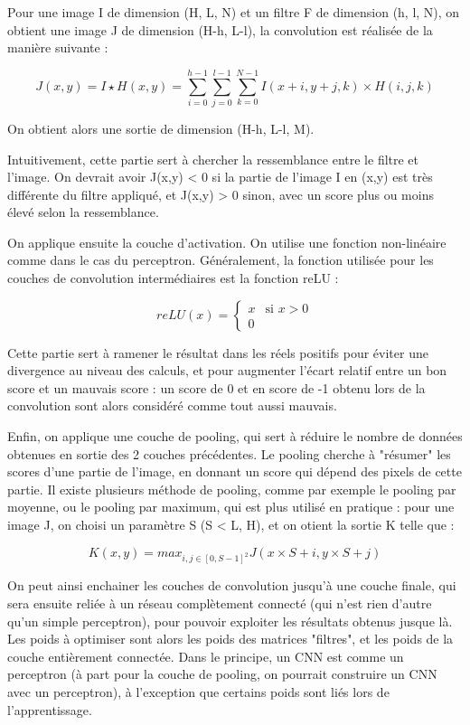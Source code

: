 Pour une image I de dimension (H, L, N) et un filtre F de dimension (h, l, N), on obtient une image J de dimension (H-h, L-l), la convolution est réalisée de la manière suivante :

\begin{equation}
    J(x, y) = I \star H (x, y) = \sum_{i=0}^{h - 1} \sum_{j=0}^{l- 1} \sum_{k=0}^{N - 1} I(x+i, y+j, k) \times H(i, j, k)
\end{equation}

On obtient alors une sortie de dimension (H-h, L-l, M).

Intuitivement, cette partie sert à chercher la ressemblance entre le filtre et l'image.
On devrait avoir J(x,y) < 0 si la partie de l'image I en (x,y) est très différente du filtre appliqué, et J(x,y) > 0 sinon, avec un score plus ou moins élevé selon la ressemblance.


On applique ensuite la couche d'activation. On utilise une fonction non-linéaire comme dans le cas du perceptron. 
Généralement, la fonction utilisée pour les couches de convolution intermédiaires est la fonction reLU :

$$
reLU(x) = \left\{
    \begin{array}{ll}
        x & \mbox{si } x > 0 \\
        0
    \end{array}
\right.
$$

\newpage 

Cette partie sert à ramener le résultat dans les réels positifs pour éviter une divergence au niveau des calculs, et pour augmenter l'écart relatif entre un bon score et un mauvais score : un score de 0 et en score de -1 obtenu lors de la convolution sont alors considéré comme tout aussi mauvais.

Enfin, on applique une couche de pooling, qui sert à réduire le nombre de données obtenues en sortie des 2 couches précédentes.
Le pooling cherche à "résumer" les scores d'une partie de l'image, en donnant un score qui dépend des pixels de cette partie.
Il existe plusieurs méthode de pooling, comme par exemple le pooling par moyenne, ou le pooling par maximum, qui est plus utilisé en pratique :
pour une image J, on choisi un paramètre S (S < L, H), et on otient la sortie K telle que :

\begin{equation}
    K(x, y) = max_{i,j \in [0, S-1] ^2 } { J(x \times S + i , y \times S + j ) }
\end{equation}


On peut ainsi enchainer les couches de convolution jusqu'à une couche finale, qui sera ensuite reliée à un réseau complètement connecté (qui n'est rien d'autre qu'un simple perceptron), pour pouvoir exploiter les résultats obtenus jusque là.
Les poids à optimiser sont alors les poids des matrices "filtres", et les poids de la couche entièrement connectée.
Dans le principe, un CNN est comme un perceptron (à part pour la couche de pooling, on pourrait construire un CNN avec un perceptron), à l'exception que certains poids sont liés lors de l'apprentissage. 

